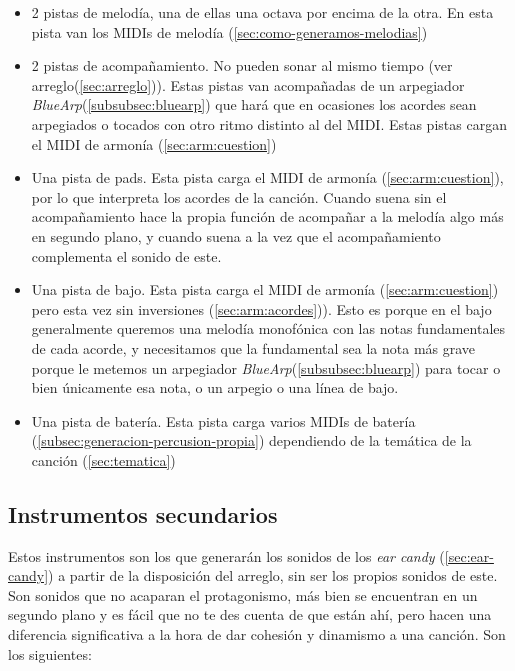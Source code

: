 \begin{itemize}
\item 2 pistas de melodía, una de ellas una octava por encima de la otra. En esta pista van los MIDIs de melodía (\ref{sec:como-generamos-melodias})
\item 2 pistas de acompañamiento. No pueden sonar al mismo tiempo (ver arreglo(\ref{sec:arreglo})). Estas pistas van acompañadas de un arpegiador \textit{BlueArp}(\ref{subsubsec:bluearp}) que hará que en ocasiones los acordes sean arpegiados o tocados con otro ritmo distinto al del MIDI. Estas pistas cargan el MIDI de armonía (\ref{sec:arm:cuestion})
\item Una pista de pads. Esta pista carga el MIDI de armonía (\ref{sec:arm:cuestion}), por lo que interpreta los acordes de la canción. Cuando suena sin el acompañamiento hace la propia función de acompañar a la melodía algo más en segundo plano, y cuando suena a la vez que el acompañamiento complementa el sonido de este.
\item Una pista de bajo. Esta pista carga el MIDI de armonía (\ref{sec:arm:cuestion}) pero esta vez sin inversiones (\ref{sec:arm:acordes})). Esto es porque en el bajo generalmente queremos una melodía monofónica con las notas fundamentales de cada acorde, y necesitamos que la fundamental sea la nota más grave porque le metemos un arpegiador \textit{BlueArp}(\ref{subsubsec:bluearp}) para tocar o bien únicamente esa nota, o un arpegio o una línea de bajo.
\item Una pista de batería. Esta pista carga varios MIDIs de batería (\ref{subsec:generacion-percusion-propia}) dependiendo de la temática de la canción (\ref{sec:tematica})
\end{itemize}

\subsection{Instrumentos secundarios}
\label{subsec:instrumentos-secundarios}
Estos instrumentos son los que generarán los sonidos de los \textit{ear candy} (\ref{sec:ear-candy}) a partir de la disposición del arreglo, sin ser los propios sonidos de este. Son sonidos que no acaparan el protagonismo, más bien se encuentran en un segundo plano y es fácil que no te des cuenta de que están ahí, pero hacen una diferencia significativa a la hora de dar cohesión y dinamismo a una canción. Son los siguientes:


